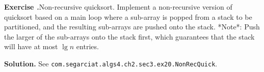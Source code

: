 \documentclass[12pt, a4paper]{article}
\newenvironment{ex}[2][Exercise]
{\par\medskip\noindent \textbf{#1 #2.}}
{\medskip}
\newenvironment{sol}[1][Solution]
{\par\medskip\noindent \textbf{#1.} }
{\medskip}
\begin{document}
	\begin{ex}{20}
		\emph{Non-recursive quicksort}. Implement a non-recursive version of quicksort based on
		a main loop where a sub-array is popped from a stack to be partitioned, and the
		resulting sub-arrays are pushed onto the stack. *Note*: Push the larger of the
		sub-arrays onto the stack first, which guarantees that the stack will have at most
		$\lg n$ entries.
	\end{ex}
	\begin{sol}
		See \texttt{com.segarciat.algs4.ch2.sec3.ex20.NonRecQuick}.
	\end{sol}
	\pagebreak
	\printbibliography
\end{document}
